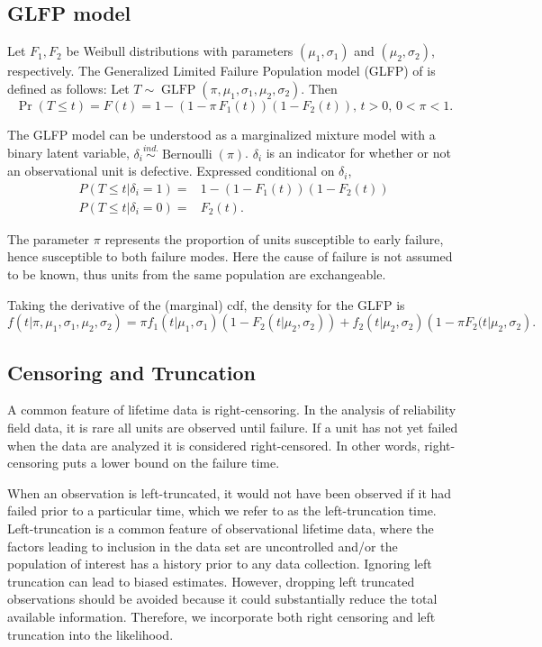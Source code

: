 \documentclass[12pt]{article}
\newcommand{\ind}{\stackrel{ind.}{\sim}}
\newcommand{\op}{\operatorname}
\begin{document}
\subsection{GLFP model}
\label{subsec:GLFP model}
Let $F_1,F_2$ be Weibull distributions with parameters $(\mu_1,\sigma_1)$ and $(\mu_2, \sigma_2)$, respectively.
The Generalized Limited Failure Population model (GLFP) of \citet{chan} is defined as follows: Let $T \sim \op{GLFP}(\pi, \mu_1,\sigma_1,\mu_2,\sigma_2)$. Then
$$\Pr(T \le t) = F(t) = 1 - (1-\pi\, F_{1}(t))(1 - F_{2}(t)),\, t>0,\, 0 < \pi < 1.$$

The GLFP model can be understood as a marginalized mixture model with a binary latent variable, $\delta_i\ind \op{Bernoulli}(\pi)$. $\delta_i$ is an indicator for whether or not an observational unit is defective. Expressed conditional on $\delta_i$,
\begin{align*}
P(T\le t | \delta_i=1) =& 1 -(1-F_1(t))(1-F_2(t))\\
P(T\le t | \delta_i=0) =& F_2(t).
\end{align*}

 
The parameter $\pi$ represents the proportion of units susceptible to early failure, hence susceptible to both failure modes. Here the cause of failure is not assumed to be known, thus units from the same population are exchangeable.

Taking the derivative of the (marginal) cdf, the density for the GLFP is
\begin{equation}
f(t|\pi, \mu_1,\sigma_1, \mu_2, \sigma_2) = \pi f_1(t|\mu_1,\sigma_1)\left(1-F_2(t|\mu_2,\sigma_2)\right) + f_2(t|\mu_2,\sigma_2)\left(1-\pi F_2(t|\mu_2,\sigma_2\right).
\end{equation}

\subsection{Censoring and Truncation}
A common feature of lifetime data is right-censoring. In the analysis of reliability field data, it is rare all units are observed until failure. If a unit has not yet failed when the data are analyzed it is considered right-censored.  In other words, right-censoring puts a lower bound on the failure time.


When an observation is left-truncated, it would not have been observed if it had failed prior to a particular time, which we refer to as the left-truncation time.  Left-truncation is a common feature of observational lifetime data, where the factors leading to inclusion in the data set are uncontrolled and/or the population of interest has a history prior to any data collection. Ignoring left truncation can lead to biased estimates. However, dropping left truncated observations should be avoided because it could substantially reduce the total available information.  Therefore, we incorporate both right censoring and left truncation into the likelihood. 
\end{document}
